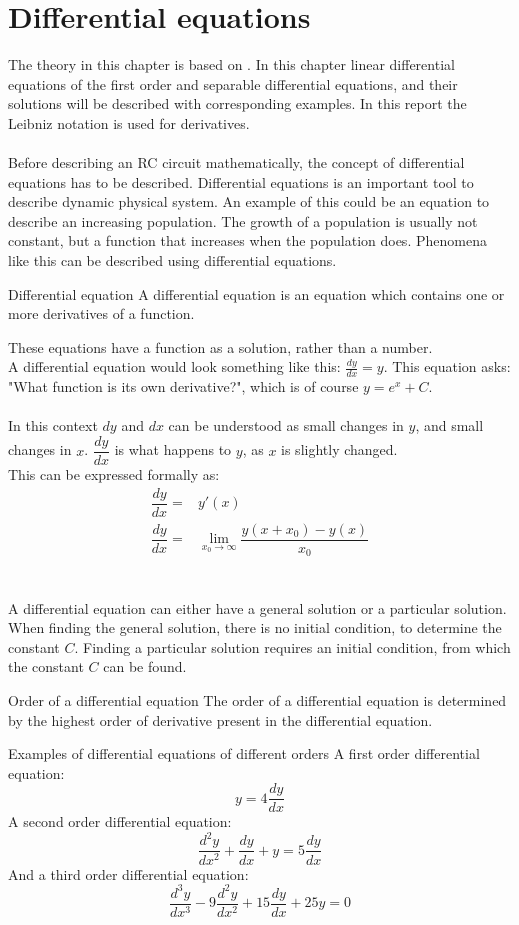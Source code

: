 \chapter{Differential equations} 
The theory in this chapter is based on \cite{diffandcomplex}. In this chapter linear differential equations of the first order and separable differential equations, and their solutions will be described with corresponding examples. In this report the Leibniz notation is used for derivatives. 
\\
\\
Before describing an RC circuit mathematically, the concept of differential equations has to be described. Differential equations is an important tool to describe dynamic physical system. An example of this could be an equation to describe an increasing population. The growth of a population is usually not constant, but a function that increases when the population does. Phenomena like this can be described using differential equations.
\begin{definition}{Differential equation}{}
A differential equation is an equation which contains one or more derivatives of a function.
\end{definition}
\noindent
These equations have a function as a solution, rather than a number. 
\\
A differential equation would look something like this: $\frac{dy}{dx} = y$. This equation asks: "What function is its own derivative?", which is of course $y=e^x+C$.
\\ \\
In this context $dy$ and $dx$ can be understood as small changes in $y$, and small changes in $x$. $\dfrac{dy}{dx}$ is what happens to $y$, as $x$ is slightly changed.
\\
This can be expressed formally as:
\begin{align*}
	\dfrac{dy}{dx} =& y'(x) \\
	\dfrac{dy}{dx} =& \lim_{x_0\to\infty} \dfrac{y(x+x_0)-y(x)}{x_0}
\end{align*}
\\ \\
A differential equation can either have a general solution or a particular solution. When finding the general solution, there is no initial condition, to determine the constant $C$. Finding a particular solution requires an initial condition, from which the constant $C$ can be found.
\\
\begin{definition}{Order of a differential equation}{}
The order of a differential equation is determined by the highest order of derivative present in the differential equation.
\end{definition} 
\begin{example}{Examples of differential equations of different orders}
A first order differential equation:
$$y=4\frac{dy}{dx} $$
A second order differential equation:
$$\frac{d^2y}{dx^2}+\frac{dy}{dx}+y = 5\frac{dy}{dx}$$
And a third order differential equation:
$$\frac{d^3y}{dx^3} - 9\frac{d^2y}{dx^2} + 15\frac{dy}{dx} + 25y = 0$$
\end{example}
